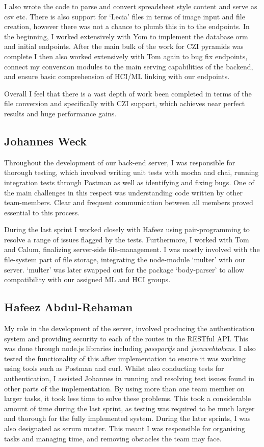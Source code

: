 I also wrote the code to parse and convert spreadsheet style content and serve as csv etc. There is also support for `Lecia' files in terms of image input and file creation, however there was not a chance to plumb this in to the endpoints.
In the beginning, I worked extensively with Yom to implement the database orm and initial endpoints. After the main bulk of the work for CZI pyramids was complete I then also worked extensively with Tom again to bug fix endpoints, connect my conversion modules to the main serving capabilities of the backend, and ensure basic comprehension of HCI/ML linking with our endpoints.

Overall I feel that there is a vast depth of work been completed in terms of the file conversion and specifically with CZI support, which achieves near perfect results and huge performance gains.
\subsection{Johannes Weck}
Throughout the development of our back-end server, I was responsible for thorough testing, which involved writing unit tests with mocha and chai, running integration tests through Postman as well as identifying and fixing bugs. One of the main challenges in this respect was understanding code written by other team-members. Clear and frequent communication between all members proved essential to this process.

During the last sprint I worked closely with Hafeez using pair-programming to resolve a range of issues flagged by the tests. Furthermore, I worked with Tom and Calum, finalizing server-side file-management. I was mostly involved with the file-system part of file storage, integrating the node-module `multer' with our server. `multer' was later swapped out for the package `body-parser' to allow compatibility with our assigned ML and HCI groups.
\subsection{Hafeez Abdul-Rehaman}
My role in the development of the server, involved producing the authentication system and providing security to each of the routes in the RESTful API. This was done through node.js libraries including \textit{passportjs} and \textit{jsonwebtokens}. I also tested the functionality of this after implementation to ensure it was working using tools such as Postman and curl. Whilst also conducting tests for authentication, I assisted Johannes in running and resolving test issues found in other parts of the implementation. By using more than one team member on larger tasks, it took less time to solve these problems. This took a considerable amount of time during the last sprint, as testing was required to be much larger and thorough for the fully implemented system. During the later sprints, I was also designated as scrum master. This meant I was responsible for organising tasks and managing time, and removing obstacles the team may face.

